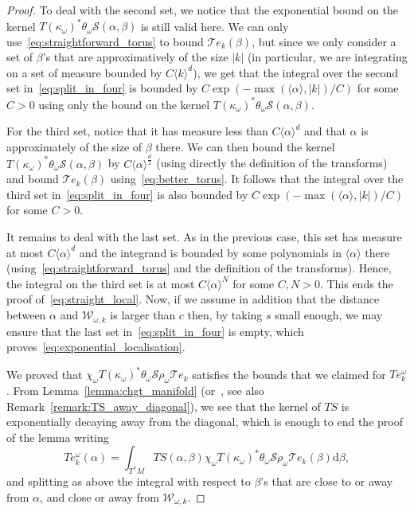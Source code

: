 \documentclass[10pt]{amsart}
\theoremstyle{definition}\newtheorem{defi}[theo]{Definition}\newtheorem{rema}[theo]{Remark}\newtheorem{exam}[theo]{Example}\newtheorem{exem}[theo]{Example}\newtheorem{nota}[theo]{Notation}
\newcommand{\brac}[1]{\langle #1 \rangle}
\newcommand{\clT}{\mathcal{T}}
\newcommand{\clS}{\mathcal{S}}
\newcommand{\clW}{\mathcal{W}}
\newcommand{\rmd}{\mathrm{d}}
\begin{document}
\begin{proof}
To deal with the second set, we notice that the exponential bound on the kernel $T(\kappa_\omega)^* \theta_\omega \clS(\alpha,\beta)$ is still valid here. We can only use~\eqref{eq:straightforward_torus} to bound $\clT e_k(\beta)$, but since we only consider a set of $\beta$'s that are approximatively of the size $|k|$ (in particular, we are integrating on a set of measure bounded by $C \brac{k}^d$), we get that the integral over the second set in~\eqref{eq:split_in_four} is bounded by $C \exp(- \max(\brac{\alpha},|k|)/C)$ for some $C > 0$ using only the bound on the kernel $T(\kappa_\omega)^* \theta_\omega \clS(\alpha,\beta)$.

For the third set, notice that it has measure less than $C \brac{\alpha}^d$ and that $\alpha$ is approximately of the size of $\beta$ there. We can then bound the kernel $T(\kappa_\omega)^* \theta_\omega \clS(\alpha,\beta)$ by $C \brac{\alpha}^{\frac{d}{2}}$ (using directly the definition of the transforms) and bound $\clT e_k(\beta)$ using~\eqref{eq:better_torus}. It follows that the integral over the third set in~\eqref{eq:split_in_four} is also bounded by $C \exp(- \max(\brac{\alpha},|k|)/C)$ for some $C > 0$.

It remains to deal with the last set. As in the previous case, this set has measure at most $C \brac{\alpha}^d$ and the integrand is bounded by some polynomials in $\brac{\alpha}$ there (using~\eqref{eq:straightforward_torus} and the definition of the transforms). Hence, the integral on the third set is at most $C \brac{\alpha}^N$ for some $C,N > 0$. This ends the proof of~\eqref{eq:straight_local}. Now, if we assume in addition that the distance between $\alpha$ and $\clW_{\omega,k}$ is larger than $c$ then, by taking $s$ small enough, we may ensure that the last set in~\eqref{eq:split_in_four} is empty, which proves~\eqref{eq:exponential_localisation}.

We proved that $\chi_\omega T(\kappa_\omega)^* \theta_\omega \clS\rho_\omega \clT e_k$ satisfies the bounds that we claimed for $T e_k^\omega$. From Lemma~\ref{lemma:chgt_manifold} (or~\cite[Lemma~2.9]{BJ20}, see also Remark~\ref{remark:TS_away_diagonal}), we see that the kernel of $TS$ is exponentially decaying away from the diagonal, which is enough to end the proof of the lemma writing
\begin{equation*}
T e_k^\omega (\alpha) = \int_{T^* M} TS(\alpha,\beta)\chi_\omega T(\kappa_\omega)^* \theta_\omega \clS\rho_\omega \clT e_k(\beta) \rmd \beta,
\end{equation*}
and splitting as above the integral with respect to $\beta$'s that are close to or away from $\alpha$, and close or away from $\clW_{\omega,k}$.
\end{proof}
\end{document}
